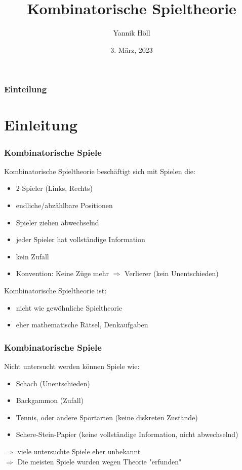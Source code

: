 \documentclass[12pt, aspectratio=169]{beamer}
\title{Kombinatorische Spieltheorie}
\author[Y. Höll]{Yannik Höll}
\date{3. März, 2023}
\begin{document}
\begin{frame}
	\titlepage
\end{frame}

\begin{frame}
	\frametitle{Einteilung}
	\tableofcontents
\end{frame}

\section{Einleitung}
\begin{frame}
    \frametitle{Kombinatorische Spiele}
    Kombinatorische Spieltheorie beschäftigt sich mit Spielen die:

\begin{itemize}
    \item 2 Spieler (Links, Rechts)
    \item endliche/abzählbare Positionen
    \item Spieler ziehen abwechselnd
    \item jeder Spieler hat vollständige Information
    \item kein Zufall
    \item Konvention: Keine Züge mehr $\Rightarrow$ Verlierer (kein Unentschieden)
\end{itemize}

 {
Kombinatorische Spieltheorie ist:
\begin{itemize}
    \item nicht wie gewöhnliche Spieltheorie
    \item eher mathematische Rätsel, Denkaufgaben
\end{itemize}
}
\end{frame}

\begin{frame}
\frametitle{Kombinatorische Spiele}

Nicht untersucht werden können Spiele wie:
\begin{itemize}
    \item<2-> Schach (Unentschieden)
    \item<3-> Backgammon (Zufall)
    \item<4-> Tennis, oder andere Sportarten (keine diskreten Zustände)
    \item<5-> Schere-Stein-Papier (keine vollständige Information, nicht abwechselnd)
\end{itemize}

 {
    $\Rightarrow$ viele untersuchte Spiele eher unbekannt \\
    $\Rightarrow$ Die meisten Spiele wurden wegen Theorie "erfunden"
}
\end{frame}
\end{document}
